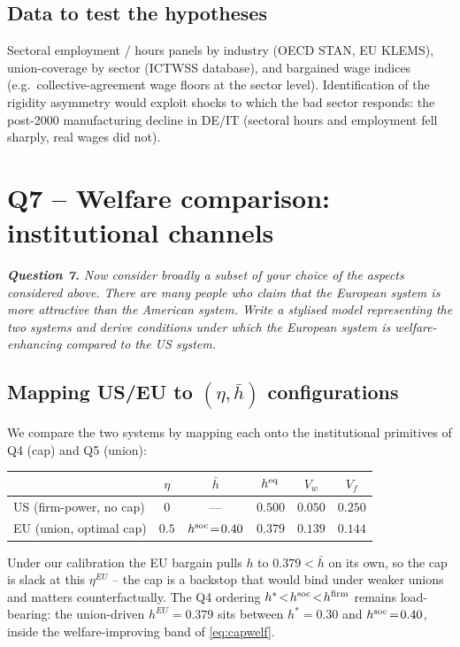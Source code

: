 \documentclass[9pt,a4paper]{extarticle}
\begin{document}
\subsection{Data to test the hypotheses}
Sectoral employment / hours panels by industry (OECD STAN, EU
KLEMS), union-coverage by sector (ICTWSS database), and bargained
wage indices (e.g.\ collective-agreement wage floors at the
sector level). Identification of the rigidity asymmetry would
exploit shocks to which the bad sector responds: the
post-2000 manufacturing decline in DE/IT (sectoral hours and
employment fell sharply, real wages did not).

\section{Q7 -- Welfare comparison: institutional channels}

\begingroup\small\itshape\noindent\textbf{Question 7.} Now consider
broadly a subset of your choice of the aspects considered above.
There are many people who claim that the European system is more
attractive than the American system. Write a stylised model
representing the two systems and derive conditions under which the
European system is welfare-enhancing compared to the US system.
\endgroup

\subsection{Mapping US/EU to $(\eta,\bar h)$ configurations}
We compare the two systems by mapping each onto the institutional
primitives of Q4 (cap) and Q5 (union):
\begin{center}\small
\begin{tabular}{lccccc}
\toprule
& $\eta$ & $\bar h$ & $h^{\rm eq}$ & $V_w$ & $V_f$ \\
\midrule
US (firm-power, no cap) & $0$ & --- & $0.500$ & $0.050$ & $0.250$ \\
EU (union, optimal cap) & $0.5$ & $h^{\rm soc}\!=\!0.40$ & $0.379$ & $0.139$ & $0.144$ \\
\bottomrule
\end{tabular}
\end{center}
Under our calibration the EU bargain pulls $h$ to $0.379\!<\!\bar h$
on its own, so the cap is slack at this $\eta^{EU}$ -- the cap is
a backstop that would bind under weaker unions and matters
counterfactually. The Q4 ordering
$h^*\!<\!h^{\rm soc}\!<\!h^{\rm firm}$ remains load-bearing: the
union-driven $h^{EU}\!=\!0.379$ sits between $h^*\!=\!0.30$ and
$h^{\rm soc}\!=\!0.40$, inside the welfare-improving band of
\eqref{eq:capwelf}.
\end{document}
